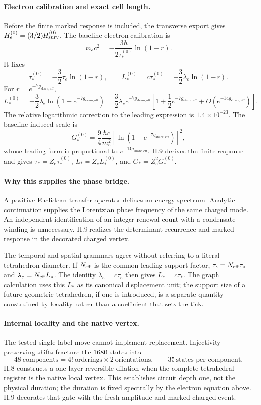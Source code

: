 \documentclass[11pt]{article}
\begin{document}
\paragraph{Electron calibration and exact cell length.}
Before the finite marked response is included, the transverse export gives $H_e^{(0)}=(3/2)H_{\rm surv}^{(0)}$. The baseline electron calibration is
\[
m_ec^2
=-\frac{3\hbar}{2\tau_*^{(0)}}\ln(1-r).
\]
It fixes
\[
\boxed{
\tau_*^{(0)}=-\frac32\tau_e\ln(1-r),
\qquad
L_*^{(0)}=c\tau_*^{(0)}=-\frac32\lambda_e\ln(1-r)
}.
\]
For $r=e^{-7g_{\mathrm{share,eff}}}$,
\[
L_*^{(0)}=-\frac32\lambda_e\ln\!\left(1-e^{-7g_{\mathrm{share,eff}}}\right)
=\frac32\lambda_e e^{-7g_{\mathrm{share,eff}}}
\left[1+\frac12e^{-7g_{\mathrm{share,eff}}}+O(e^{-14g_{\mathrm{share,eff}}})\right].
\]
The relative logarithmic correction to the leading expression is $1.4\times10^{-23}$. The baseline induced scale is
\[
G_*^{(0)}
=\frac94\frac{\hbar c}{m_e^2}
\left[\ln\!\left(1-e^{-7g_{\mathrm{share,eff}}}\right)\right]^2,
\]
whose leading form is proportional to $e^{-14g_{\mathrm{share,eff}}}$. H.9 derives the finite response and gives $\tau_*=Z_e\tau_*^{(0)}$, $L_*=Z_eL_*^{(0)}$, and $G_*=Z_e^2G_*^{(0)}$.

\paragraph{Why this supplies the phase bridge.}
A positive Euclidean transfer operator defines an energy spectrum. Analytic continuation supplies the Lorentzian phase frequency of the same charged mode. An independent identification of an integer renewal count with a condensate winding is unnecessary. H.9 realizes the determinant recurrence and marked response in the decorated charged vertex.

The temporal and spatial grammars agree without referring to a literal tetrahedron diameter. If $N_{\rm eff}$ is the common leading support factor, $\tau_e=N_{\rm eff}\tau_*$ and $\lambda_e=N_{\rm eff}L_*$. The identity $\lambda_e=c\tau_e$ then gives $L_*=c\tau_*$. The graph calculation uses this $L_*$ as its canonical displacement unit; the support size of a future geometric tetrahedron, if one is introduced, is a separate quantity constrained by locality rather than a coefficient that sets the tick.

\paragraph{Internal locality and the native vertex.}
The tested single-label move cannot implement replacement. Injectivity-preserving shifts fracture the $1680$ states into
\[
48\ \text{components}=4!\ \text{orderings}\times2\ \text{orientations},
\qquad
35\ \text{states per component}.
\]
H.8 constructs a one-layer reversible dilation when the complete tetrahedral register is the native local vertex. This establishes circuit depth one, not the physical duration; the duration is fixed spectrally by the electron equation above. H.9 decorates that gate with the fresh amplitude and marked charged event.
\end{document}

